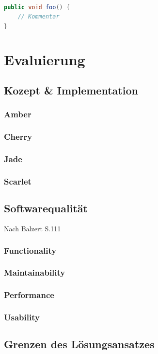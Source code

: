 \documentclass[12pt,oneside,a4paper,parskip]{scrbook}
\begin{document}
\begin{lstlisting}[label=lst:java,
				   language=java,
				   firstnumber=1,
				   caption=Beispiel für einen Quelltext]

public void foo() {
	// Kommentar
}
\end{lstlisting}

\chapter{Evaluierung}
\section{Kozept \& Implementation}
\subsection{Amber}
\subsection{Cherry}
\subsection{Jade}
\subsection{Scarlet}
\section{Softwarequalität}
Nach Balzert S.111
\subsection{Functionality}
\subsection{Maintainability}
\subsection{Performance}
\subsection{Usability}
\section{Grenzen des Lösungsansatzes}
\end{document}

